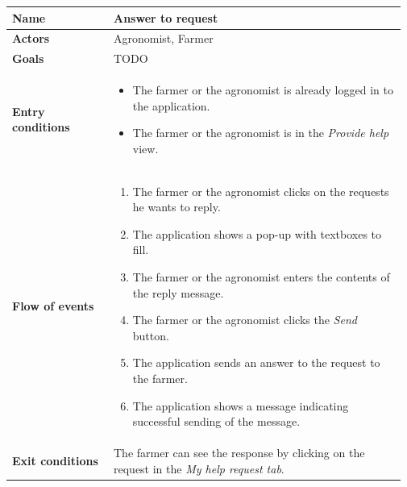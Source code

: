 \begin{table}[H]
    \centering
	\begin{tabular}{@{}p{0.25\linewidth} p{0.72\linewidth}@{}}
\toprule
		\textbf{Name}               & Answer to request\\
		\midrule
		\textbf{Actors}             & Agronomist, Farmer\\
		\midrule
		\textbf{Goals}              & TODO \\
		\midrule
		
		\textbf{Entry conditions}   & \begin{itemize}[leftmargin=.4cm,noitemsep,topsep=0pt,before=\vspace{-3mm},after=\vspace{-4mm}]
		    \item The farmer or the agronomist is already logged in to the application.
		    \item The farmer or the agronomist is in the \textit{Provide help} view.
		\end{itemize}\\
		\midrule
		
		\textbf{Flow of events}     & \begin{enumerate}[leftmargin=.4cm,noitemsep,topsep=0pt,before=\vspace{-3mm},after=\vspace{-4mm}]
		    \item The farmer or the agronomist clicks on the requests he wants to reply. 
		    \item The application shows a pop-up with textboxes to fill.
		    \item The farmer or the agronomist enters the contents of the reply message.
		    \item The farmer or the agronomist clicks the \textit{Send} button.
		    \item The application sends an answer to the request to the farmer.
		    \item The application shows a message indicating successful sending of the message.
		\end{enumerate}\\
		\midrule
		\textbf{Exit conditions}    & The farmer can see the response by clicking on the request in the \textit{My help request tab}. \\
		\midrule
		

\end{tabular}
\end{table}
